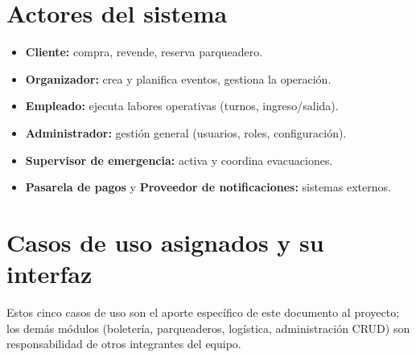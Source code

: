 \documentclass[12pt,a4paper]{article}
\begin{document}
\section{Actores del sistema}

\begin{itemize}
\item \textbf{Cliente:} compra, revende, reserva parqueadero.
\item \textbf{Organizador:} crea y planifica eventos, gestiona la operación.
\item \textbf{Empleado:} ejecuta labores operativas (turnos, ingreso/salida).
\item \textbf{Administrador:} gestión general (usuarios, roles, configuración).
\item \textbf{Supervisor de emergencia:} activa y coordina evacuaciones.
\item \textbf{Pasarela de pagos} y \textbf{Proveedor de notificaciones:} sistemas externos.
\end{itemize}

\section{Casos de uso asignados y su interfaz}

Estos cinco casos de uso son el aporte específico de este documento al proyecto; los demás
módulos (boletería, parqueaderos, logística, administración CRUD) son responsabilidad de otros
integrantes del equipo.
\end{document}
